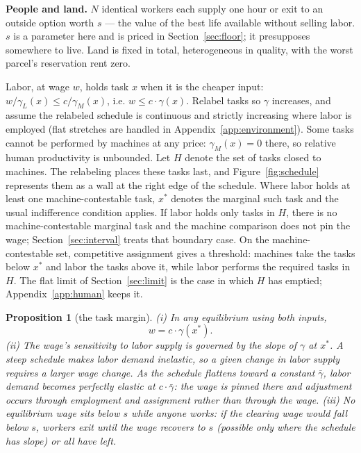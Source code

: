 \documentclass[12pt]{article}
\theoremstyle{plain}
\newtheorem{proposition}{Proposition}
\begin{document}
\textbf{People and land.} $N$ identical workers each supply one hour or exit to an
outside option worth $s$ --- the value of the best life available without selling
labor. $s$ is a parameter here and is priced in Section~\ref{sec:floor}; it
presupposes somewhere to live. Land is fixed in total, heterogeneous in quality,
with the worst parcel's reservation rent zero.

Labor, at wage $w$, holds task $x$ when it is the cheaper input:
$w/\gamma_L(x) \le c/\gamma_M(x)$, i.e.
$w \le c\cdot\gamma(x)$. Relabel tasks so $\gamma$ increases, and assume the
relabeled schedule is continuous and strictly increasing where labor is employed
(flat stretches are handled in Appendix~\ref{app:environment}). Some tasks cannot be performed by machines at any price:
$\gamma_M(x)=0$ there, so relative human productivity is unbounded.
Let $H$ denote the set of tasks closed to machines. The relabeling places
these tasks last, and Figure~\ref{fig:schedule} represents them as a wall at
the right edge of the schedule. Where labor holds at least one
machine-contestable task, $x^*$ denotes the marginal such task and the usual
indifference condition applies. If labor holds only tasks in $H$, there is no
machine-contestable marginal task and the machine comparison does not pin the
wage; Section~\ref{sec:interval} treats that boundary case. On the
machine-contestable set, competitive assignment gives a threshold: machines
take the tasks below $x^*$ and labor the tasks above it, while labor performs
the required tasks in $H$. The flat limit of Section~\ref{sec:limit} is the
case in which $H$ has emptied; Appendix~\ref{app:human} keeps it.

\begin{proposition}[the task margin]\label{prop:margin}
(i) In any equilibrium using both inputs,
\[
w = c\cdot\gamma(x^*).
\]
(ii) The wage's sensitivity to labor supply is governed by the slope of $\gamma$
at $x^*$. A steep schedule makes labor demand inelastic, so a given change in
labor supply requires a larger wage change. As the schedule flattens toward a
constant $\bar{\gamma}$, labor demand becomes perfectly elastic at
$c\cdot\bar{\gamma}$: the wage is pinned there and adjustment occurs through
employment and assignment rather than through the wage.
(iii) No equilibrium wage sits below $s$ while anyone works: if the clearing wage
would fall below $s$, workers exit until the wage recovers to $s$ (possible only
where the schedule has slope) or all have left.
\end{proposition}
\end{document}
